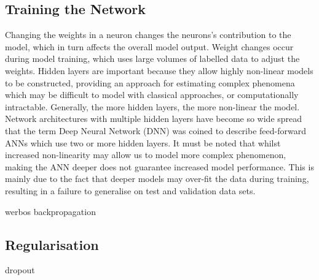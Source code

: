 \subsection{Training the Network}
Changing the weights in a neuron changes the neurons’s contribution to the model, which in turn affects the overall model output. Weight changes occur during model training, which uses large volumes of labelled data to adjust the weights. Hidden layers are important because they allow highly non-linear models to be constructed, providing an approach for estimating complex phenomena which may be difficult to model with classical approaches, or computationally intractable. Generally, the more hidden layers, the more non-linear the model. Network architectures with multiple hidden layers have become so wide spread that the term Deep Neural Network (DNN) was coined to describe feed-forward ANNs which use two or more hidden layers. It must be noted that whilst increased non-linearity may allow us to model more complex phenomenon, making the ANN deeper does not guarantee increased model performance. This is mainly due to the fact that deeper models may over-fit the data during training, resulting in a failure to generalise on test and validation data sets.

werbos backpropagation

\subsection{Regularisation}
dropout